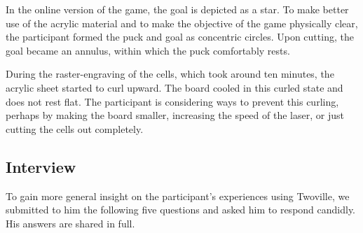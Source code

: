 In the online version of the game, the goal is depicted as a star. To make better use of the acrylic material and to make the objective of the game physically clear, the participant formed the puck and goal as concentric circles. Upon cutting, the goal became an annulus, within which the puck comfortably rests.

During the raster-engraving of the cells, which took around ten minutes, the acrylic sheet started to curl upward. The board cooled in this curled state and does not rest flat. The participant is considering ways to prevent this curling, perhaps by making the board smaller, increasing the speed of the laser, or just cutting the cells out completely.

\subsection{Interview}

To gain more general insight on the participant's experiences using Twoville, we submitted to him the following five questions and asked him to respond candidly. His answers are shared in full.

